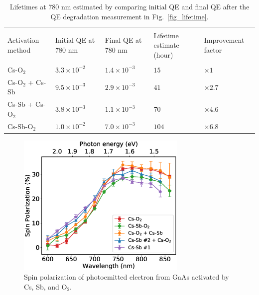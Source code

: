 \setlength{\tabcolsep}{4pt}	
\begin{table}
	\centering
	
	\begin{tabular}{l|llll}
		\hline \hline \\
		\multirow{2}{5em}{Activation method} & \multirow{2}{5em}{Initial QE at 780 nm}            & \multirow{2}{5em}{Final QE at 780 nm}               & %
		\multirow{2}{7em}{Lifetime estimate (hour)} & \multirow{2}{6em}{Improvement factor} \\
		 \\
		\hline
		\\Cs-O$_2$ & $3.3 \times 10^{-2}$              &    $1.4 \times 10^{-3}$           & %
		$15$    &$\times 1$                                                                \\
		Cs-O$_2$ + Cs-Sb			 & $9.5 \times 10^{-3}$ & $2.9 \times 10^{-3}$	& %
		$41$ &$\times 2.7$\\
		Cs-Sb + Cs-O$_2$    & $3.8 \times 10^{-3}$              & $1.1 \times 10^{-3}$      & %
		$70$        & $\times 4.6$                                                                   \\
	
		Cs-Sb-O$_2$				& $1.0 \times 10^{-2}$			& $7.0 \times 10^{-3}$	&%
		$104 $	&$ \times 6.8$	\\

		\hline \hline                                                                             
	\end{tabular}
	\caption{Lifetimes at 780 nm estimated by comparing initial QE and final QE after the QE degradation measurement in Fig.~\ref{fig_lifetime}.}
	\label{table2}
\end{table}


\begin{figure}
	\centering
	\includegraphics*[width=230pt]{figs/CsSbO/pol.eps}
	\caption{Spin polarization of photoemitted electron from GaAs activated by Cs, Sb, and O$_2$.}
	\label{fig_polarization}
\end{figure}

